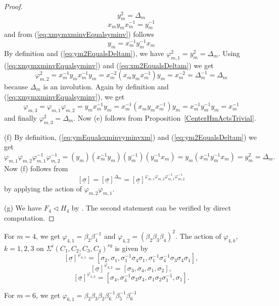 \documentclass[12pt,a4paper]{article}
\numberwithin{equation}{section}
\numberwithin{table}{section}
\begin{document}
\begin{proof}
\begin{equation}
\label{eq:ym2EqualsDeltam}
y_m^2 = \Delta_m
\end{equation}
\begin{equation} 
\label{eq:xmymxminvEqualsyminv}
x_m y_m x_m^{-1} = y_m^{-1}
\end{equation}
and from (\ref{eq:xmymxminvEqualsyminv}) follows
\begin{equation} 
\label{eq:ymEqualsxminvyminvxm}
 y_m = x_m^{-1} y_m^{-1} x_m
\end{equation}
By definition and (\ref{eq:ym2EqualsDeltam}), we have $\varphi^2_{m,1} = y_m^2 = \Delta_m$.
Using (\ref{eq:xmymxminvEqualsyminv}) and (\ref{eq:xm2EqualsDeltam}) we get
$$\varphi^2_{m,2} = x_m^{-1} y_m x_m^{-1} y_m =  x_m^{-2} (x_m y_m x_m^{-1}) y_m = x_m^{-2} = \Delta_m^{-1} = \Delta_m$$
because $\Delta_m$ is an involution. Again by definition and (\ref{eq:xmymxminvEqualsyminv}), we get
$$\varphi_{m,3} = \varphi_{m,1} \varphi_{m,2} =  y_m x_m^{-1} y_m = x_m^{-1} (x_m y_m x_m^{-1}) y_m =
x_m^{-1} y_m^{-1} y_m = x_m^{-1}$$
and finally $\varphi^2_{m,3} = \Delta_m$. Now (e) follows from Proposition~\ref{CenterHmActsTrivial}.
\par
\noindent
(f) By definition, (\ref{eq:ymEqualsxminvyminvxm}) and (\ref{eq:ym2EqualsDeltam}) we get
$$\varphi_{m,1} \varphi_{m,2} \varphi^{-1}_{m,1} \varphi^{-1}_{m,2} =
(y_m) (x_m^{-1} y_m) (y_m^{-1}) (y_m^{-1} x_m) = 
y_m (x_m^{-1} y_m^{-1} x_m) = y_m^2 = \Delta_m.$$
Now (f) follows from 
$$[\underline{\sigma}] = [\underline{\sigma}]^{\Delta_m} =
[\underline{\sigma}]^{\varphi_{m,1} \varphi_{m,2} \varphi^{-1}_{m,1} \varphi^{-1}_{m,2}}$$
by applying the action of $\varphi_{m,2} \varphi_{m,1}$.
\par
\noindent
(g) We have $F_4 \vartriangleleft H_4$ by \cite[III, Proposition 1.9]{RefMM2018}.
The second statement can be verified by direct computation.
\end{proof}
%
\noindent
For $m=4$, we get $\varphi_{4,1} = \beta_2 \beta_4^{-1}$ and $\varphi_{4,2} = (\beta_2 \beta_3 \beta_4)^2$.
The action of $\varphi_{4,k}$, $k=1,2,3$ on $\Sigma^i(C_1,C_2,C_3,C_4)^{sy}$ is given by
$$[\underline{\sigma}]^{\varphi_{4,1}} = [\sigma_2,\sigma_1,\sigma^{-1}_1 \sigma_4 \sigma_1,
\sigma^{-1}_1 \sigma^{-1}_4 \sigma_3 \sigma_4 \sigma_1],$$
$$[\underline{\sigma}]^{\varphi_{4,2}} = [\sigma_3,\sigma_4,\sigma_1,\sigma_2],$$
$$[\underline{\sigma}]^{\varphi_{4,3}} = [\sigma_4, \sigma^{-1}_4 \sigma_3 \sigma_4,
\sigma_1 \sigma_2 \sigma^{-1}_1,\sigma_1].$$
%
\par
\noindent
For $m=6$, we get $\varphi_{6,1} = \beta_2 \beta_3 \beta_2 \beta_6^{-1} \beta_5^{-1} \beta_6^{-1}$
\end{document}
